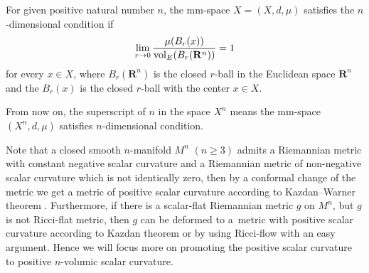 \documentclass[pdftex]{sigma}
\begin{document}
\begin{Definition}
For given positive natural number $n$, the mm-space $X=(X, d, \mu)$ satisfies the $n$-dimensional condition if
\begin{align*}
 \lim\limits_{r \to 0}\frac{\mu(B_r(x))}{{\rm vol}_E(B_r(\mathbf{R}^n))}=1
\end{align*}
 for every $x \in X$, where $B_r(\mathbf{R}^n)$ is the closed $r$-ball in the Euclidean space $\mathbf{R}^n$ and the $B_r(x)$ is the closed $r$-ball with the center $x\in X$.
\end{Definition}

 From now on, the superscript of $n$ in the space $X^n$ means the mm-space $(X^n, d, \mu)$ satisfies $n$-dimensional condition.

 Note that a closed smooth $n$-manifold $M^n$ $(n\geq 3)$ admits a Riemannian metric with constant negative scalar curvature and a Riemannian metric of non-negative scalar curvature which is not identically zero, then by a conformal change of the metric we get a metric of positive scalar curvature according to Kazdan--Warner theorem \cite{MR365409}. Furthermore, if there is a scalar-flat Riemannian metric $g$ on $M^n$, but $g$ is not Ricci-flat metric, then $g$ can be deformed to a~metric with positive scalar curvature according to Kazdan theorem \cite[Theorem~B]{MR675736} or by using Ricci-flow with an easy argument. Hence we will focus more on promoting the positive scalar curvature to positive $n$-volumic scalar curvature.
\end{document}
